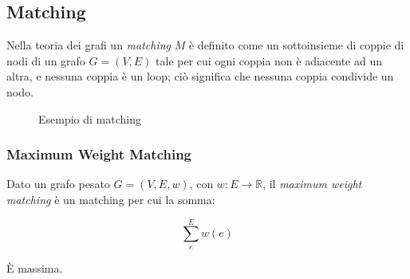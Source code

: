 \subsection{Matching}
Nella teoria dei grafi un \textit{matching} $M$ è definito come un sottoinsieme di coppie di nodi di un grafo $G = (V, E)$ tale per cui ogni coppia non è adiacente ad un altra, e nessuna coppia è un loop; ciò significa che nessuna coppia condivide un nodo.

\begin{figure}[h]
    \centering
    \caption{Esempio di matching}
    \label{fig:intro-extra-matching}
\end{figure}

\subsubsection{Maximum Weight Matching}
\label{chap:intro-extra-matching-maxw}
Dato un grafo pesato $G = (V, E, w)$, con $w: E \rightarrow \mathbb{R}$, il \textit{maximum weight matching} è un matching per cui la somma:

\begin{equation}
    \label{eq:intro-extra-matching-maxw}
    \sum_e^{E} w(e)
\end{equation}

È massima.